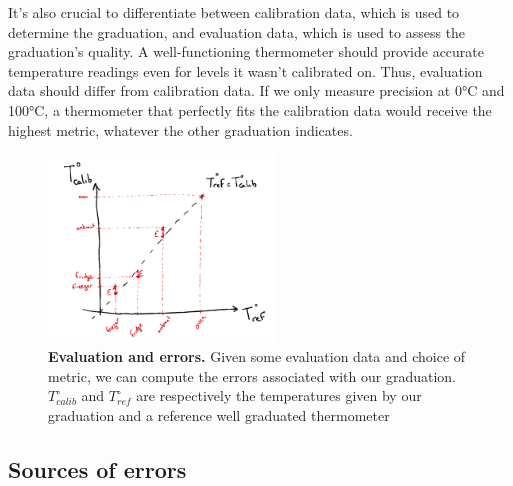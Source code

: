 \begin{bibunit}
It's also crucial to differentiate between calibration data, which is used to determine the graduation, and evaluation data, which is used to assess the graduation's quality.
A well-functioning thermometer should provide accurate temperature readings even for levels it wasn't calibrated on. Thus, evaluation data should differ from calibration data.
If we only measure precision at 0°C and 100°C, a thermometer that perfectly fits the calibration data would receive the highest metric, whatever the other graduation indicates.

\begin{figure}
\includegraphics[clip, width=6cm]{Introduction/pics/errors.png}  
    \centering
    \caption{\textbf{Evaluation and errors.} Given some evaluation data and choice of metric, we can compute the errors associated with our graduation. $T^{\circ}_{calib}$ and $T^{\circ}_{ref}$ are respectively the temperatures given by our graduation and a reference well graduated thermometer}
    \label{fig:errors}
\end{figure}



 \subsection*{Sources of errors}



\end{bibunit}
